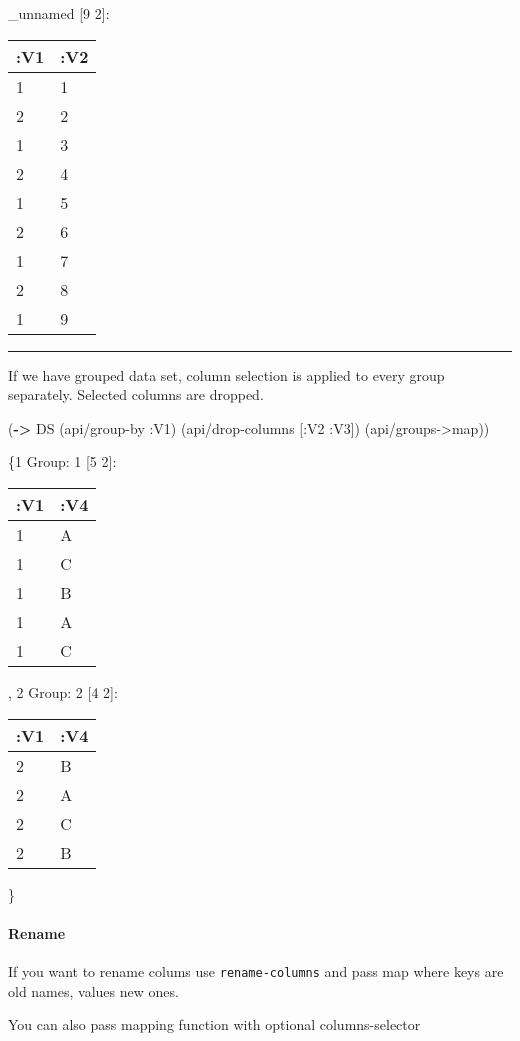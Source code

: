 \documentclass[]{article}
\newenvironment{Shaded}{\begin{snugshade}}{\end{snugshade}}
\newcommand{\KeywordTok}[1]{\textcolor[rgb]{0.13,0.29,0.53}{\textbf{#1}}}
\newcommand{\AttributeTok}[1]{\textcolor[rgb]{0.77,0.63,0.00}{#1}}
\newcommand{\NormalTok}[1]{#1}
\let\oldparagraph\paragraph
\renewcommand{\paragraph}[1]{\oldparagraph{#1}\mbox{}}
\begin{document}
\_unnamed {[}9 2{]}:

\begin{longtable}[]{@{}ll@{}}
\toprule
:V1 & :V2\tabularnewline
\midrule
\endhead
1 & 1\tabularnewline
2 & 2\tabularnewline
1 & 3\tabularnewline
2 & 4\tabularnewline
1 & 5\tabularnewline
2 & 6\tabularnewline
1 & 7\tabularnewline
2 & 8\tabularnewline
1 & 9\tabularnewline
\bottomrule
\end{longtable}

\begin{center}\rule{0.5\linewidth}{0.5pt}\end{center}

If we have grouped data set, column selection is applied to every group
separately. Selected columns are dropped.

\begin{Shaded}
\begin{Highlighting}[]
\NormalTok{(}\KeywordTok{->}\NormalTok{ DS}
\NormalTok{    (api/group-by }\AttributeTok{:V1}\NormalTok{)}
\NormalTok{    (api/drop-columns [}\AttributeTok{:V2} \AttributeTok{:V3}\NormalTok{])}
\NormalTok{    (api/groups->map))}
\end{Highlighting}
\end{Shaded}

\{1 Group: 1 {[}5 2{]}:

\begin{longtable}[]{@{}ll@{}}
\toprule
:V1 & :V4\tabularnewline
\midrule
\endhead
1 & A\tabularnewline
1 & C\tabularnewline
1 & B\tabularnewline
1 & A\tabularnewline
1 & C\tabularnewline
\bottomrule
\end{longtable}

, 2 Group: 2 {[}4 2{]}:

\begin{longtable}[]{@{}ll@{}}
\toprule
:V1 & :V4\tabularnewline
\midrule
\endhead
2 & B\tabularnewline
2 & A\tabularnewline
2 & C\tabularnewline
2 & B\tabularnewline
\bottomrule
\end{longtable}

\}

\paragraph{Rename}\label{rename}

If you want to rename colums use \texttt{rename-columns} and pass map
where keys are old names, values new ones.

You can also pass mapping function with optional columns-selector
\end{document}
